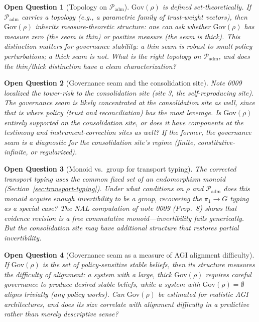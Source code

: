 \documentclass[11pt]{article}
\newtheorem{openquestion}{Open Question}
\newcommand{\Gov}{\mathrm{Gov}}
\newcommand{\Padm}{\mathcal{P}_{\mathrm{adm}}}
\begin{document}
\begin{openquestion}[Topology on $\Padm$]
\label{oq:padm-topology}
$\Gov(\rho)$ is defined set-theoretically. If $\Padm$ carries a topology (e.g., a parametric
family of trust-weight vectors), then $\Gov(\rho)$ inherits measure-theoretic structure: one
can ask whether $\Gov(\rho)$ has measure zero (the seam is thin) or positive measure (the seam
is thick). This distinction matters for governance stability: a thin seam is robust to small
policy perturbations; a thick seam is not. What is the right topology on $\Padm$, and does the
thin/thick distinction have a clean characterization?
\end{openquestion}

\begin{openquestion}[Governance seam and the consolidation site]
\label{oq:gov-consolidation}
Note 0009 localized the tower-risk to the consolidation site (site 3, the self-reproducing
site). The governance seam is likely concentrated at the consolidation site as well, since
that is where policy (trust and reconciliation) has the most leverage. Is $\Gov(\rho)$ entirely
supported on the consolidation site, or does it have components at the testimony and
instrument-correction sites as well? If the former, the governance seam is a diagnostic for
the consolidation site's regime (finite, constitutive-infinite, or regularized).
\end{openquestion}

\begin{openquestion}[Monoid vs.\ group for transport typing]
\label{oq:monoid-group}
The corrected transport typing uses the common fixed set of an endomorphism monoid
(Section~\ref{sec:transport-typing}). Under what conditions on $\rho$ and $\Padm$ does this
monoid acquire enough invertibility to be a group, recovering the $\pi_1 \to G$ typing as a
special case? The NAL computation of note 0009 (Prop.~8) shows that evidence revision is a
free commutative monoid---invertibility fails generically. But the consolidation site may
have additional structure that restores partial invertibility.
\end{openquestion}

\begin{openquestion}[Governance seam as a measure of AGI alignment difficulty]
\label{oq:agi-alignment}
If $\Gov(\rho)$ is the set of policy-sensitive stable beliefs, then its structure measures the
difficulty of alignment: a system with a large, thick $\Gov(\rho)$ requires careful governance
to produce desired stable beliefs, while a system with $\Gov(\rho) = \emptyset$ aligns
trivially (any policy works). Can $\Gov(\rho)$ be estimated for realistic AGI architectures,
and does its size correlate with alignment difficulty in a predictive rather than merely
descriptive sense?
\end{openquestion}
\end{document}
